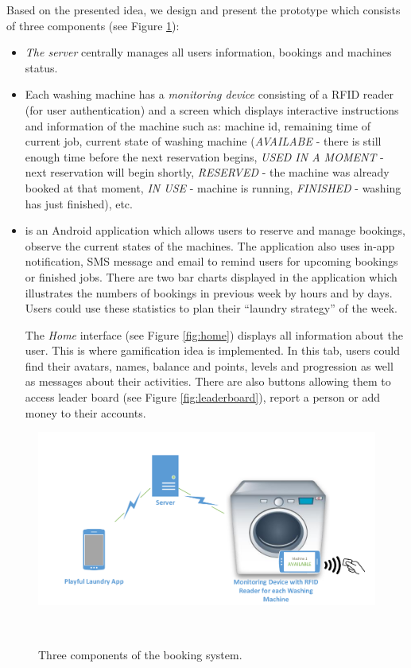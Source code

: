 Based on the presented idea, we design and present the prototype which consists of three components (see Figure \ref{fig:figure1}):
\begin{itemize}
\item 
\emph{The server} centrally manages all users information, bookings and machines status.

\item 
Each washing machine has a \emph{monitoring device} consisting of a RFID reader (for user authentication) and a screen which displays interactive instructions and information of the machine such as: machine id, remaining time of current job, current state of washing machine (\emph{AVAILABE} - there is still enough time before the next reservation begins, \emph{USED IN A MOMENT} - next reservation will begin shortly, \emph{RESERVED} - the machine was already booked at that moment, \emph{IN USE} - machine is running, \emph{FINISHED} - washing has just finished), etc.

\item 
\emph{{\toolname}} is an Android application which allows users to reserve and manage bookings, observe the current states of the machines. The application also uses in-app notification, SMS message and email to remind users for upcoming bookings or finished jobs. There are two bar charts displayed in the application which illustrates the numbers of bookings in previous week by hours and by days. Users could use these statistics to plan their ``laundry strategy'' of the week.

The \emph{Home} interface (see Figure \ref {fig:home}) displays all information about the user. This is where gamification idea is implemented. In this tab, users could find their avatars, names, balance and points, levels and progression as well as messages about their activities. There are also buttons allowing them to access leader board (see Figure \ref{fig:leaderboard}), report a person or add money to their accounts. 

\end{itemize}
\begin{figure}[h]
\centering
  \includegraphics[width=.8\columnwidth]{figures/overview}
  \caption{Three components of the booking system.}~\label{fig:figure1}
\end{figure}

